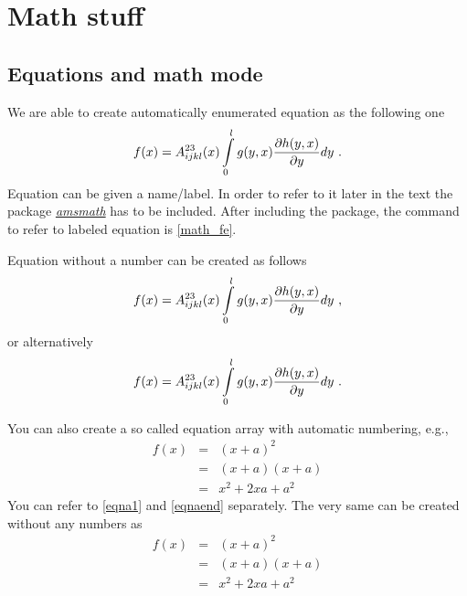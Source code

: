\documentclass[a4paper,11pt,oneside]{book}
\newcommand{\imp}[1]{\underline{\textit{#1}}}
\begin{document}

\chapter{Math stuff}


\section{Equations and math mode}

We are able to create automatically enumerated equation as the following one
\begin{equation}
	f(x)
	= A^{23}_{ijkl}(x) \int_0^l\limits g(y,x) \frac{\partial h(y,x)}{\partial y} d y \ .
	\label{math_fe}
\end{equation}
Equation can be given a name/label. In order to refer to it later in the text the package \imp{amsmath} has to be included. After including the package, the command to refer to labeled equation is \eqref{math_fe}.

Equation without a number can be created as follows
\begin{equation*}
	f(x)
	= A^{23}_{ijkl}(x) \int_0^l\limits g(y,x) \frac{\partial h(y,x)}{\partial y} d y \ ,
\end{equation*}
or alternatively 
\[
	f(x)
	= A^{23}_{ijkl}(x) \int_0^l\limits g(y,x) \frac{\partial h(y,x)}{\partial y} d y \ .
\]

You can also create a so called equation array with automatic numbering, e.g.,
\begin{eqnarray}
	f(x)
		&=& (x+a)^2 \label{eqna1} \\
		&=& (x+a)(x+a) \label{eqna2}\\
		&=& x^2 + 2 x a + a^2
	\label{eqnaend}
\end{eqnarray}
You can refer to \eqref{eqna1} and \eqref{eqnaend} separately. The very same can be created without any numbers as
\begin{eqnarray*}
	f(x)
		&=& (x+a)^2 \\
		&=& (x+a)(x+a) \\
		&=& x^2 + 2 x a + a^2
\end{eqnarray*}
\end{document}
